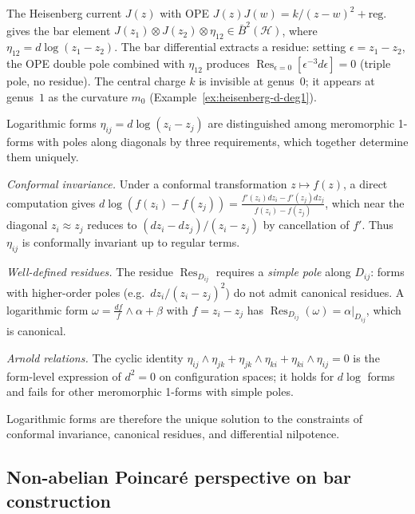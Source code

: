 \begin{example}\label{ex:ope-to-residue}
The Heisenberg current $J(z)$ with OPE $J(z)J(w) = k/(z-w)^2 + \text{reg.}$ gives the bar element $J(z_1) \otimes J(z_2) \otimes \eta_{12} \in \bar{B}^2(\mathcal{H})$, where $\eta_{12} = d\log(z_1 - z_2)$.  The bar differential extracts a residue: setting $\epsilon = z_1 - z_2$, the OPE double pole combined with $\eta_{12}$ produces $\operatorname{Res}_{\epsilon=0}[\epsilon^{-3}d\epsilon] = 0$ (triple pole, no residue).  The central charge $k$ is invisible at genus~$0$; it appears at genus~$1$ as the curvature $m_0$ (Example~\ref{ex:heisenberg-d-deg1}).
\end{example}

\begin{remark}\label{rem:why-log-forced}
Logarithmic forms $\eta_{ij} = d\log(z_i - z_j)$ are distinguished among meromorphic 1-forms with poles along diagonals by three requirements, which together determine them uniquely.

\emph{Conformal invariance.}
Under a conformal transformation $z \mapsto f(z)$, a direct computation gives
$d\log(f(z_i) - f(z_j)) = \frac{f'(z_i)dz_i - f'(z_j)dz_j}{f(z_i) - f(z_j)}$,
which near the diagonal $z_i \approx z_j$ reduces to $(dz_i - dz_j)/(z_i - z_j)$
by cancellation of $f'$.  Thus $\eta_{ij}$ is conformally invariant up to regular terms.

\emph{Well-defined residues.}
The residue $\operatorname{Res}_{D_{ij}}$ requires a \emph{simple pole} along $D_{ij}$: forms with higher-order poles (e.g.\ $dz_i/(z_i - z_j)^2$) do not admit canonical residues.  A logarithmic form $\omega = \frac{df}{f} \wedge \alpha + \beta$ with $f = z_i - z_j$ has $\operatorname{Res}_{D_{ij}}(\omega) = \alpha|_{D_{ij}}$, which is canonical.

\emph{Arnold relations.}
The cyclic identity
$\eta_{ij} \wedge \eta_{jk} + \eta_{jk} \wedge \eta_{ki} + \eta_{ki} \wedge \eta_{ij} = 0$
is the form-level expression of $d^2 = 0$ on configuration spaces; it holds for $d\log$ forms and fails for other meromorphic 1-forms with simple poles.

Logarithmic forms are therefore the unique solution to the constraints of conformal invariance, canonical residues, and differential nilpotence.
\end{remark}

\subsection{Non-abelian Poincaré perspective on bar construction}

